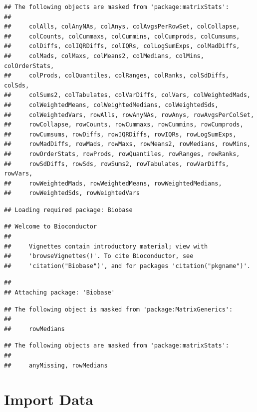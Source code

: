 \documentclass[
]{article}
\begin{document}
\begin{verbatim}
## The following objects are masked from 'package:matrixStats':
## 
##     colAlls, colAnyNAs, colAnys, colAvgsPerRowSet, colCollapse,
##     colCounts, colCummaxs, colCummins, colCumprods, colCumsums,
##     colDiffs, colIQRDiffs, colIQRs, colLogSumExps, colMadDiffs,
##     colMads, colMaxs, colMeans2, colMedians, colMins, colOrderStats,
##     colProds, colQuantiles, colRanges, colRanks, colSdDiffs, colSds,
##     colSums2, colTabulates, colVarDiffs, colVars, colWeightedMads,
##     colWeightedMeans, colWeightedMedians, colWeightedSds,
##     colWeightedVars, rowAlls, rowAnyNAs, rowAnys, rowAvgsPerColSet,
##     rowCollapse, rowCounts, rowCummaxs, rowCummins, rowCumprods,
##     rowCumsums, rowDiffs, rowIQRDiffs, rowIQRs, rowLogSumExps,
##     rowMadDiffs, rowMads, rowMaxs, rowMeans2, rowMedians, rowMins,
##     rowOrderStats, rowProds, rowQuantiles, rowRanges, rowRanks,
##     rowSdDiffs, rowSds, rowSums2, rowTabulates, rowVarDiffs, rowVars,
##     rowWeightedMads, rowWeightedMeans, rowWeightedMedians,
##     rowWeightedSds, rowWeightedVars
\end{verbatim}

\begin{verbatim}
## Loading required package: Biobase
\end{verbatim}

\begin{verbatim}
## Welcome to Bioconductor
## 
##     Vignettes contain introductory material; view with
##     'browseVignettes()'. To cite Bioconductor, see
##     'citation("Biobase")', and for packages 'citation("pkgname")'.
\end{verbatim}

\begin{verbatim}
## 
## Attaching package: 'Biobase'
\end{verbatim}

\begin{verbatim}
## The following object is masked from 'package:MatrixGenerics':
## 
##     rowMedians
\end{verbatim}

\begin{verbatim}
## The following objects are masked from 'package:matrixStats':
## 
##     anyMissing, rowMedians
\end{verbatim}

\hypertarget{import-data}{%
\section{Import Data}\label{import-data}}
\end{document}
